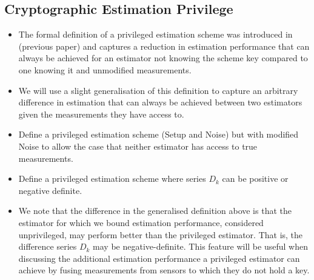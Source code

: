 \documentclass[conference]{IEEEtran}
\begin{document}
\subsection{Cryptographic Estimation Privilege}\label{subsec:crypto_privilege}
\begin{itemize}
  \item The formal definition of a privileged estimation scheme was introduced in (previous paper) and captures a reduction in estimation performance that can always be achieved for an estimator not knowing the scheme key compared to one knowing it and unmodified measurements.
  \item We will use a slight generalisation of this definition to capture an arbitrary difference in estimation that can always be achieved between two estimators given the measurements they have access to.
  \item Define a privileged estimation scheme (Setup and Noise) but with modified Noise to allow the case that neither estimator has access to true measurements.
  \item Define a privileged estimation scheme where series $D_k$ can be positive or negative definite.
  \item We note that the difference in the generalised definition above is that the estimator for which we bound estimation performance, considered unprivileged, may perform better than the privileged estimator. That is, the difference series $D_k$ may be negative-definite. This feature will be useful when discussing the additional estimation performance a privileged estimator can achieve by fusing measurements from sensors to which they do not hold a key.
\end{itemize}

% 
%                                                                      
%                                                                      
%                                                                      
% 
\end{document}
